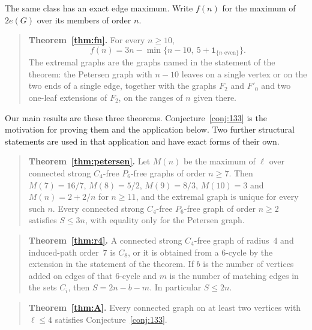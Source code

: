 \documentclass[ASNA]{USG}
\theoremstyle{WBstyletwo}
\numberwithin{equation}{section}
\newcommand{\lr}{\ell}
\begin{document}
\noindent The same class has an exact edge maximum. Write $f(n)$ for the maximum of $2e(G)$ over its members of order $n$.

\begin{quote}
\textbf{Theorem~\ref{thm:fn}.}
For every $n\ge 10$,
\[
f(n)=3n-\min\bigl\{n-10,\ 5+\mathbf{1}_{\{n\text{ even}\}}\bigr\}.
\]
The extremal graphs are the graphs named in the statement of the theorem: the Petersen graph with $n-10$ leaves on a single vertex or on the two ends of a single edge, together with the graphs $F_2$ and $F'_0$ and two one-leaf extensions of $F_2$, on the ranges of $n$ given there.
\end{quote}

Our main results are these three theorems. Conjecture~\ref{conj:133} is the motivation for proving them and the application below. Two further structural statements are used in that application and have exact forms of their own.

\begin{quote}
\textbf{Theorem~\ref{thm:petersen}.}
Let $M(n)$ be the maximum of $\lr$ over connected strong $C_4$-free $P_6$-free graphs of order $n\ge 7$. Then $M(7)=16/7$, $M(8)=5/2$, $M(9)=8/3$, $M(10)=3$ and $M(n)=2+2/n$ for $n\ge 11$, and the extremal graph is unique for every such $n$. Every connected strong $C_4$-free $P_6$-free graph of order $n\ge 2$ satisfies $S\le 3n$, with equality only for the Petersen graph.
\end{quote}

\begin{quote}
\textbf{Theorem~\ref{thm:r4}.}
A connected strong $C_4$-free graph of radius~$4$ and induced-path order~$7$ is $C_8$, or it is obtained from a $6$-cycle by the extension in the statement of the theorem. If $b$ is the number of vertices added on edges of that $6$-cycle and $m$ is the number of matching edges in the sets $C_i$, then $S=2n-b-m$. In particular $S\le 2n$.
\end{quote}

\begin{quote}
\textbf{Theorem~\ref{thm:A}.}
Every connected graph on at least two vertices with $\lr\le 4$ satisfies Conjecture~\ref{conj:133}.
\end{quote}
\end{document}
